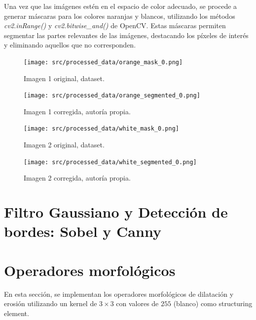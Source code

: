 \documentclass[a4paper,12pt]{article}
\begin{document}
{Una vez que las imágenes estén en el espacio de color adecuado, se procede a generar máscaras para los colores naranjas y 
blancos, utilizando los métodos \textit{cv2.inRange()} y \textit{cv2.bitwise\_and()} de OpenCV. Estas máscaras permiten segmentar
las partes relevantes de las imágenes, destacando los píxeles de interés y eliminando aquellos que no corresponden. 

\begin{figure}[H]
  \centering
  \begin{minipage}[b]{0.45\textwidth}
      \centering
      \texttt{[image: src/processed\_data/orange\_mask\_0.png]}
      \caption{Imagen 1 original, dataset.}
      \label{fig:izquierda1}
  \end{minipage}
  \hfill
  \begin{minipage}[b]{0.45\textwidth}
      \centering
      \texttt{[image: src/processed\_data/orange\_segmented\_0.png]}
      \caption{Imagen 1 corregida, autoría propia.}
      \label{fig:derecha1}
  \end{minipage}
  
  \vspace{1cm} 

  \begin{minipage}[b]{0.45\textwidth}
      \centering
      \texttt{[image: src/processed\_data/white\_mask\_0.png]}
      \caption{Imagen 2 original, dataset.}
      \label{fig:izquierda2}
  \end{minipage}
  \hfill
  \begin{minipage}[b]{0.45\textwidth}
      \centering
      \texttt{[image: src/processed\_data/white\_segmented\_0.png]}
      \caption{Imagen 2 corregida, autoría propia.}
      \label{fig:derecha2}
  \end{minipage}
\end{figure}


\section{Filtro Gaussiano y Detección de bordes: Sobel y Canny}

\section{Operadores morfológicos}

En esta sección, se implementan los operadores morfológicos de dilatación y erosión
utilizando un kernel de \(3 \times 3\) con valores de \(255\) (blanco) como structuring element. 

}
\end{document}
